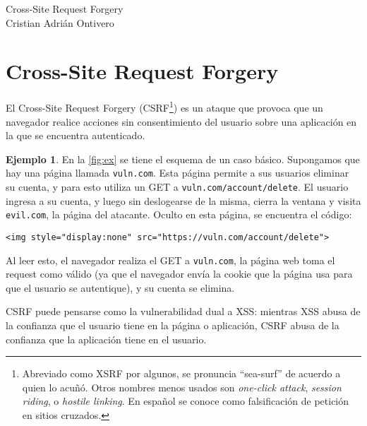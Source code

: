\documentclass{article}
\theoremstyle{definition}
\newtheorem{ex}{Ejemplo}
\begin{document}
\begin{center}
  {\LARGE Cross-Site Request Forgery}\\[.2cm]
  Cristian Adrián Ontivero \\[.05cm]%
  \isodate
\end{center}

\vspace{0.2 cm}
\section{Cross-Site Request Forgery}
El Cross-Site Request Forgery (CSRF\footnote{Abreviado como XSRF por algunos, se
  pronuncia ``sea-surf'' de acuerdo a quien lo acuñó. Otros nombres menos usados
  son \textit{one-click attack}, \textit{session riding}, o \textit{hostile
linking}. En español se conoce como falsificación de petición en sitios
cruzados.}) es un ataque que provoca que un navegador realice acciones sin
consentimiento del usuario sobre una aplicación en la que se encuentra
autenticado.

\begin{ex}\label{ex:1}
  En la \autoref{fig:ex} se tiene el esquema de un caso básico. Supongamos que
  hay una página llamada \verb+vuln.com+. Esta página
  permite a sus usuarios eliminar su cuenta, y para esto utiliza un GET a
  \verb+vuln.com/account/delete+. El usuario ingresa a su cuenta, y luego sin
  deslogearse de la misma, cierra la ventana y visita \verb+evil.com+, la página
  del atacante. Oculto en esta página, se encuentra el código: 

  \begin{center}
\verb+<img style="display:none" src="https://vuln.com/account/delete">+
  \end{center}

 Al leer  esto, el navegador realiza el GET a \verb+vuln.com+, la página web
 toma el request como válido (ya que el navegador envía la cookie que la página
 usa para que el usuario se autentique), y su cuenta se elimina.
\end{ex}



CSRF puede pensarse como la vulnerabilidad dual a XSS: mientras XSS abusa de la
confianza que el usuario tiene en la página o aplicación, CSRF abusa de la
confianza que la aplicación tiene en el usuario.
\end{document}
